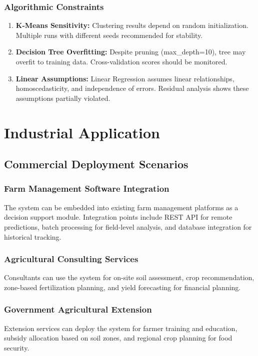 \documentclass[conference]{IEEEtran}
\begin{document}
\subsubsection{Algorithmic Constraints}
\begin{enumerate}
    \item \textbf{K-Means Sensitivity:} Clustering results depend on random initialization. Multiple runs with different seeds recommended for stability.
    
    \item \textbf{Decision Tree Overfitting:} Despite pruning (max\_depth=10), tree may overfit to training data. Cross-validation scores should be monitored.
    
    \item \textbf{Linear Assumptions:} Linear Regression assumes linear relationships, homoscedasticity, and independence of errors. Residual analysis shows these assumptions partially violated.
\end{enumerate}

\section{Industrial Application}

\subsection{Commercial Deployment Scenarios}

\subsubsection{Farm Management Software Integration}
The system can be embedded into existing farm management platforms as a decision support module. Integration points include REST API for remote predictions, batch processing for field-level analysis, and database integration for historical tracking.

\subsubsection{Agricultural Consulting Services}
Consultants can use the system for on-site soil assessment, crop recommendation, zone-based fertilization planning, and yield forecasting for financial planning.

\subsubsection{Government Agricultural Extension}
Extension services can deploy the system for farmer training and education, subsidy allocation based on soil zones, and regional crop planning for food security.
\end{document}
